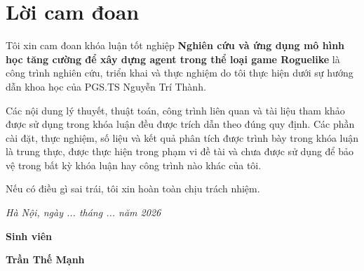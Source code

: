 \clearpage
\chapter*{Lời cam đoan}
{}

Tôi xin cam đoan khóa luận tốt nghiệp \textbf{Nghiên cứu và ứng dụng mô hình học tăng cường để xây dựng agent trong thể loại game Roguelike} là công trình nghiên cứu, triển khai và thực nghiệm do tôi thực hiện dưới sự hướng dẫn khoa học của PGS.TS Nguyễn Trí Thành.

Các nội dung lý thuyết, thuật toán, công trình liên quan và tài liệu tham khảo được sử dụng trong khóa luận đều được trích dẫn theo đúng quy định. Các phần cài đặt, thực nghiệm, số liệu và kết quả phân tích được trình bày trong khóa luận là trung thực, được thực hiện trong phạm vi đề tài và chưa được sử dụng để bảo vệ trong bất kỳ khóa luận hay công trình nào khác của tôi.

Nếu có điều gì sai trái, tôi xin hoàn toàn chịu trách nhiệm.

\vspace{1cm}
\hspace{7cm}\textit{Hà Nội, ngày ... tháng ... năm 2026}

\hspace{9.4cm}\textbf{Sinh viên}
\vspace{2.5cm}


\hspace{8.85cm}\textbf{Trần Thế Mạnh}
